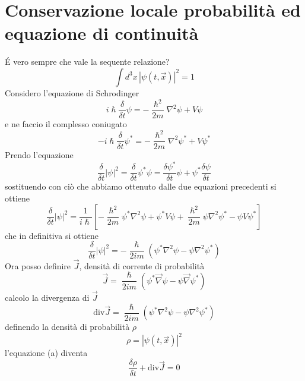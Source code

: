 \chapter{Conservazione locale probabilità ed equazione di continuità}

\'E vero sempre che vale la sequente relazione?
\begin{equation*}
    \int d^3x \, {|\psi(t,\vec{x})|}^2 = 1
\end{equation*}
Considero l'equazione di Schrodinger 
\begin{equation*}
    i\hslash \frac{\delta}{\delta t} \psi = -\frac{\hslash^2}{2m}\nabla^2 \psi + V\psi
\end{equation*}
e ne faccio il complesso coniugato
\begin{equation*}
    -i\hslash \frac{\delta}{\delta t} \psi^* = -\frac{\hslash^2}{2m}\nabla^2 \psi^* + V\psi^*
\end{equation*}
Prendo l'equazione 
\begin{equation*}
    \frac{\delta}{\delta t}{|\psi|}^2 = \frac{\delta}{\delta t} \psi^*\psi = \frac{\delta \psi^*}{\delta t}\psi + \psi^* \frac{\delta \psi}{\delta t}
\end{equation*}
sostituendo con ciò che abbiamo ottenuto dalle due equazioni precedenti si ottiene 
\begin{equation*}
    \frac{\delta}{\delta t}{|\psi|}^2 = \frac{1}{i\hslash} \left[-\frac{\hslash^2}{2m} \psi^* \nabla^2 \psi + \psi^*V\psi +\frac{\hslash^2}{2m} \psi\nabla^2\psi^* - \psi V\psi^* \right] 
\end{equation*}
che in definitiva si ottiene 
\begin{equation}
    \frac{\delta}{\delta t}{|\psi|}^2 = -\frac{\hslash}{2im} (\psi^*\nabla^2\psi - \psi\nabla^2\psi^*) \tag{a}
\end{equation}
Ora posso definire $\vec{J}$, densità di corrente di probabilità
\begin{equation*}
    \vec{J} = \frac{\hslash}{2im} (\psi^* \vec{\nabla} \psi - \psi \vec{\nabla}\psi^*)
\end{equation*}
calcolo la divergenza di $\vec{J}$
\begin{equation*}
    \mbox{div}\vec{J} = \frac{\hslash}{2im} (\psi^*\nabla^2\psi - \psi\nabla^2\psi^*)
\end{equation*}
definendo la densità di probabilità $\rho$
\begin{equation*}
    \rho = {|\psi(t,\vec{x})|}^2
\end{equation*}
l'equazione (a) diventa
\begin{equation}
    \frac{\delta \rho}{\delta t} + \mbox{div}\vec{J} = 0 \tag{b}
\end{equation}
